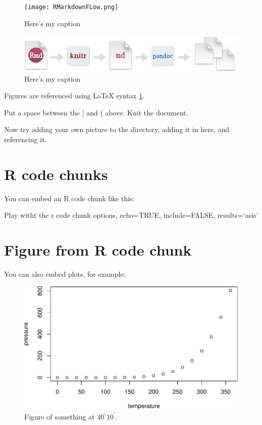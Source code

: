 \documentclass[12pt,]{article}
\begin{document}
\begin{figure}[htbp]
\centering
\texttt{[image: RMarkdownFLow.png]}
\caption{Here's my caption \label{fig:fig_example}}
\end{figure}

\begin{figure}[htbp]
\centering
\includegraphics{./Figures/RMarkdownFLow1.png}
\caption{Here's my caption \label{fig:fig_example2}}
\end{figure}

Figures are referenced using LaTeX syntax \ref{fig:fig_example}.

Put a space between the {]} and ( above. Knit the document.

Now try adding your own picture to the directory, adding it in here, and
referencing it.

\section{R code chunks}\label{r-code-chunks}

You can embed an R code chunk like this:

Play witht the r code chunk options, echo=TRUE, include=FALSE,
results=`asis'

\FloatBarrier

\section{Figure from R code chunk}\label{figure-from-r-code-chunk}

You can also embed plots, for example:

\begin{figure}[htbp]
\centering
\includegraphics{4-Workshop_examples_files/figure-latex/pressure-1.pdf}
\caption{Figure of something at \(40^\circ 10^\prime\).
\label{fig:pressure}}
\end{figure}
\end{document}
